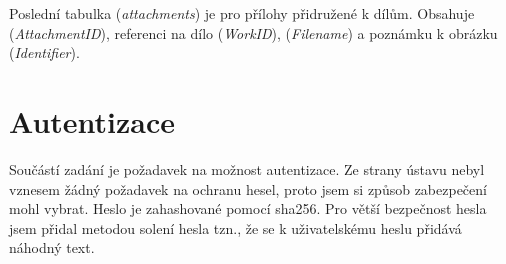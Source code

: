         Poslední tabulka (\textit{attachments}) je pro přílohy přidružené k dílům. Obsahuje (\textit{AttachmentID}), referenci na dílo (\textit{WorkID}), (\textit{Filename}) a poznámku k obrázku (\textit{Identifier}).
        
    \section{Autentizace} \label{autentizace}
        Součástí zadání je požadavek na možnost autentizace. Ze strany ústavu nebyl vznesem žádný požadavek na ochranu hesel, proto jsem si způsob zabezpečení mohl vybrat. Heslo je zahashované pomocí sha256. Pro větší bezpečnost hesla jsem přidal metodou solení hesla\cite{salt} tzn., že se k uživatelskému heslu přidává náhodný text.
